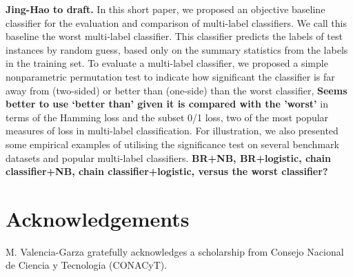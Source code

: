 \documentclass[review]{elsarticle}
\begin{document}
{\bf Jing-Hao to draft.}  In this short paper, we proposed an objective baseline classifier for the evaluation and comparison of multi-label classifiers.  We call this baseline the worst multi-label classifier.  This classifier predicts the labels of test instances by random guess, based only on the summary statistics from the labels in the training set.  To evaluate a multi-label classifier, we proposed a simple nonparametric permutation test to indicate how significant the classifier is far away from (two-sided) or better than (one-side) than the worst classifier, {\bf Seems better to use `better than' given it is compared with the 'worst'} in terms of the Hamming loss and the subset 0/1 loss, two of the most popular measures of loss in multi-label classification.  For illustration, we also presented some empirical examples of utilising the significance test on several benchmark datasets and popular multi-label classifiers. {\bf BR+NB, BR+logistic, chain classifier+NB, chain classifier+logistic, versus the worst classifier?}


\section*{Acknowledgements}
M. Valencia-Garza gratefully acknowledges a scholarship from Consejo Nacional de Ciencia y Tecnologia (CONACyT).



\end{document}
